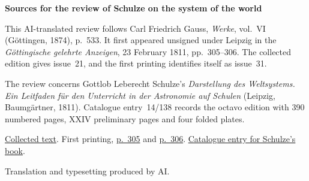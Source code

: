 \clearpage\thispagestyle{empty}
\begin{center}\textbf{Sources for the review of Schulze on the system of the world}\end{center}
\noindent This AI-translated review follows Carl Friedrich Gauss, \textit{Werke}, vol.~VI (Göttingen, 1874), p.~533. It first appeared unsigned under Leipzig in the \textit{Göttingische gelehrte Anzeigen}, 23 February 1811, pp.~305--306. The collected edition gives issue~21, and the first printing identifies itself as issue~31.
\par\smallskip\noindent The review concerns Gottlob Leberecht Schulze’s \textit{Darstellung des Weltsystems. Ein Leitfaden für den Unterricht in der Astronomie auf Schulen} (Leipzig, Baumgärtner, 1811). Catalogue entry~14/138 records the octavo edition with 390 numbered pages, XXIV preliminary pages and four folded plates.
\par\smallskip\noindent \href{https://gdz.sub.uni-goettingen.de/id/PPN236007467}{Collected text}. First printing, \href{https://images.p.sub.uni-goettingen.de/iiif/image/gdz:PPN319721507_1811:00000337/full/1650,/0/default.jpg}{p.~305} and \href{https://images.p.sub.uni-goettingen.de/iiif/image/gdz:PPN319721507_1811:00000338/full/1650,/0/default.jpg}{p.~306}. \href{https://d-nb.info/975382632/34}{Catalogue entry for Schulze’s book}.
\par\smallskip\noindent Translation and typesetting produced by AI.
\clearpage
